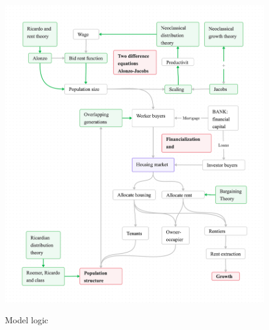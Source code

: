 {\newpage\thispagestyle{empty}
\vspace{-1.5cm}
\begin{figure}
\vspace{-3.5cm}
\begin{adjustwidth}{-0.24\textwidth}{-0.24\textwidth}
\centering
\includegraphics[scale=.2]{fig/flow_full_model.png}%
\label{Stylized model flow.}
\end{adjustwidth}
\caption{Model logic }\label{fig-flow-full-model}
\end{figure}
}


